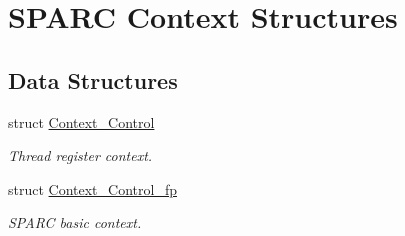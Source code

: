 \hypertarget{group__RTEMSScoreCPUSPARCContext}{}\section{S\+P\+A\+RC Context Structures}
\label{group__RTEMSScoreCPUSPARCContext}
\subsection*{Data Structures}
\begin{DoxyCompactItemize}
\item 
struct \mbox{\hyperlink{structContext__Control}{Context\+\_\+\+Control}}
\begin{DoxyCompactList}\small\item\em Thread register context. \end{DoxyCompactList}\item 
struct \mbox{\hyperlink{structContext__Control__fp}{Context\+\_\+\+Control\+\_\+fp}}
\begin{DoxyCompactList}\small\item\em S\+P\+A\+RC basic context. \end{DoxyCompactList}\end{DoxyCompactItemize}
